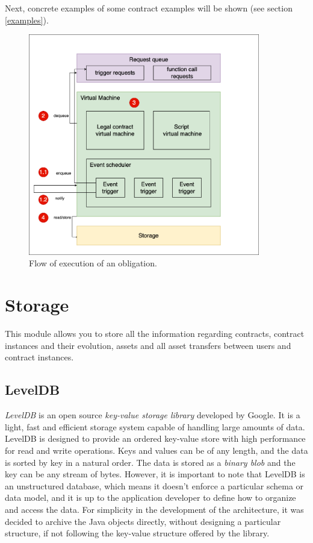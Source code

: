 Next, concrete examples of some contract examples will be shown (see section \ref{examples}).

\begin{figure}[htbp]
	\begin{center}
		\includegraphics[width=0.9\textwidth]{immagini/capitolo-5/obligation-flow.png}
		\caption{Flow of execution of an obligation.}
		\label{fig:obligation-flow}
	\end{center}
\end{figure}

\section{Storage}
\label{storage}

This module allows you to store all the information regarding contracts, contract instances and their 
evolution, assets and all asset transfers between users and contract instances.

\subsection{LevelDB}

\textit{LevelDB} \autocite{site:leveldb} is an open source \textit{key-value storage library} developed by 
Google. It is a light, fast and efficient storage system capable of handling large amounts of data. 
LevelDB is designed to provide an ordered key-value store with high performance for read and write 
operations. Keys and values can be of any length, and the data is sorted by key in a natural order. The 
data is stored as a \textit{binary blob} and the key can be any stream of bytes. However, it is important 
to note that LevelDB is an unstructured database, which means it doesn't enforce a particular schema or 
data model, and it is up to the application developer to define how to organize and access the data. For 
simplicity in the development of the architecture, it was decided to archive the Java objects directly, 
without designing a particular structure, if not following the key-value structure offered by the library.

